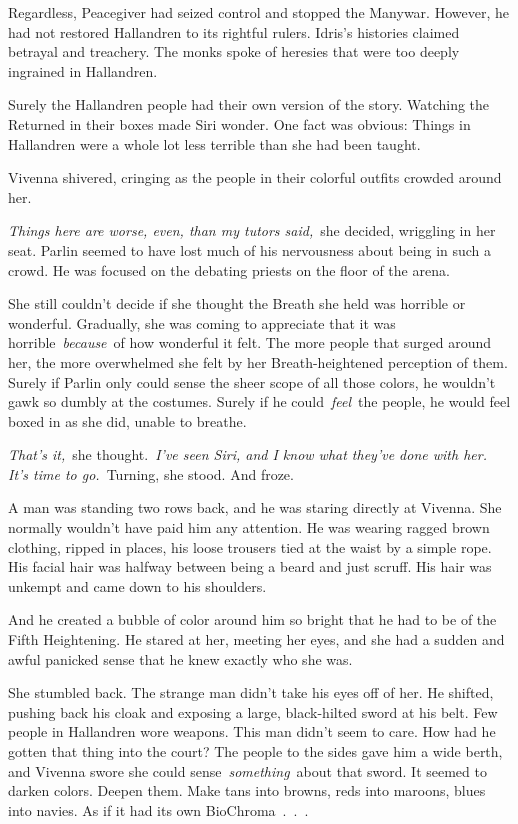 Regardless, Peacegiver had seized control and stopped the Manywar. However, he had not restored Hallandren to its rightful rulers. Idris’s histories claimed betrayal and treachery. The monks spoke of heresies that were too deeply ingrained in Hallandren.

Surely the Hallandren people had their own version of the story. Watching the Returned in their boxes made Siri wonder. One fact was obvious: Things in Hallandren were a whole lot less terrible than she had been taught.

\orn

Vivenna shivered, cringing as the people in their colorful outfits crowded around her.

\textit{Things here are worse, even, than my tutors said,}~she decided, wriggling in her seat. Parlin seemed to have lost much of his nervousness about being in such a crowd. He was focused on the debating priests on the floor of the arena.

She still couldn’t decide if she thought the Breath she held was horrible or wonderful. Gradually, she was coming to appreciate that it was horrible~\textit{because}~of how wonderful it felt. The more people that surged around her, the more overwhelmed she felt by her Breath-heightened perception of them. Surely if Parlin only could sense the sheer scope of all those colors, he wouldn’t gawk so dumbly at the costumes. Surely if he could~\textit{feel}~the people, he would feel boxed in as she did, unable to breathe.

\textit{That’s it,}~she thought.~\textit{I’ve seen Siri, and I know what they’ve done with her. It’s time to go.}~Turning, she stood. And froze.

A man was standing two rows back, and he was staring directly at Vivenna. She normally wouldn’t have paid him any attention. He was wearing ragged brown clothing, ripped in places, his loose trousers tied at the waist by a simple rope. His facial hair was halfway between being a beard and just scruff. His hair was unkempt and came down to his shoulders.

And he created a bubble of color around him so bright that he had to be of the Fifth Heightening. He stared at her, meeting her eyes, and she had a sudden and awful panicked sense that he knew exactly who she was.

She stumbled back. The strange man didn’t take his eyes off of her. He shifted, pushing back his cloak and exposing a large, black-hilted sword at his belt. Few people in Hallandren wore weapons. This man didn’t seem to care. How had he gotten that thing into the court? The people to the sides gave him a wide berth, and Vivenna swore she could sense~\textit{something}~about that sword. It seemed to darken colors. Deepen them. Make tans into browns, reds into maroons, blues into navies. As if it had its own BioChroma~.~.~.

